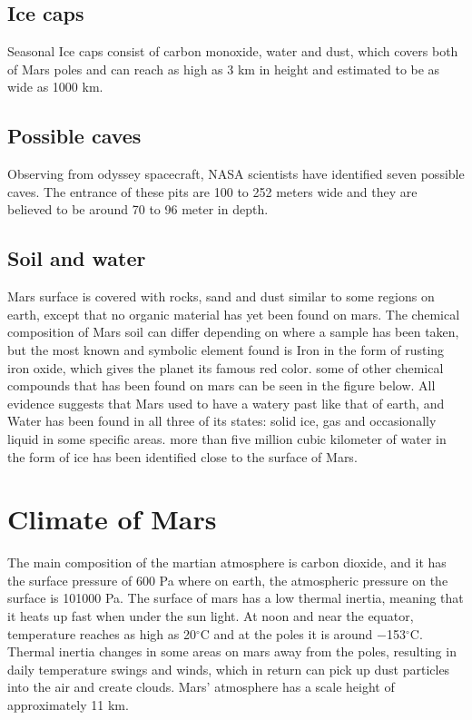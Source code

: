 \subsection{Ice caps}
Seasonal Ice caps consist of carbon monoxide, water and dust, which covers both of Mars poles and can reach as high as 3 km in height and estimated to be as wide as 1000 km.

\subsection{Possible caves}
Observing from odyssey spacecraft, NASA scientists have identified seven possible caves. The entrance of these pits are 100 to 252 meters wide and they are believed to be around 70 to 96 meter in depth\cite{surface}\cite{guide}.

\subsection{Soil and water }
Mars surface is covered with rocks, sand and dust similar to some regions on earth, except that no organic material has yet been found on mars. The chemical composition of Mars soil can differ depending on where a sample has been taken, but the most known and symbolic element found is Iron in the form of rusting iron oxide, which gives the planet its famous red color. some of other chemical compounds that has been found on mars can be seen in the figure below.
\newline All evidence suggests that Mars used to have a watery past like that of earth, and Water has been found in all three of its states: solid ice, gas and occasionally liquid in some specific areas\cite{liquid}.
more than five million cubic kilometer of water in the form of ice  has been identified close to  the surface of Mars\cite{water}.



\section{Climate of Mars}
The main composition of the martian atmosphere is carbon dioxide, and it has the surface pressure of 600 Pa where on earth, the atmospheric pressure on the surface is 101000 Pa.
\newline The surface of mars has a low thermal inertia, meaning that it heats up fast when under the sun light. At noon and near the equator, temperature reaches as high as 20$^{\circ}$C and at the poles it is around −153$^{\circ}$C. Thermal inertia changes in some areas on mars away from the poles, resulting in daily temperature swings and winds, which in return can pick up dust particles into the air and create clouds. Mars' atmosphere has a scale height of approximately 11 km\cite{climate}.


